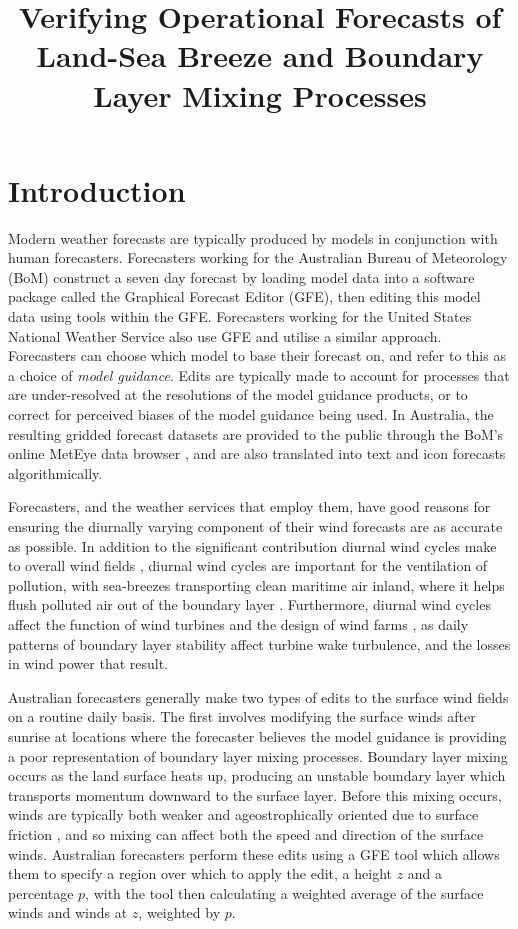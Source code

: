 \documentclass{ametsoc}
\title{Verifying Operational Forecasts of Land-Sea Breeze and Boundary Layer Mixing Processes}
\affiliation{School of Earth Sciences, and ARC Centre of Excellence for Climate Extremes, The University of Melbourne, Melbourne, Victoria, Australia.}
\begin{document}
\maketitle

\section{Introduction}
\label{Sec:Introduction}
Modern weather forecasts are typically produced by models in conjunction with human forecasters. Forecasters working for the Australian Bureau of Meteorology (BoM) construct a seven day forecast by loading model data into a software package called the Graphical Forecast Editor (GFE), then editing this model data using tools within the GFE. Forecasters working for the United States National Weather Service also use GFE and utilise a similar approach. Forecasters can choose which model to base their forecast on, and refer to this as a choice of \textit{model guidance}. Edits are typically made to account for processes that are under-resolved at the resolutions of the model guidance products, or to correct for perceived biases of the model guidance being used. In Australia, the resulting gridded forecast datasets are provided to the public through the BoM's online MetEye data browser \citep{bomMetEye19}, and are also translated into text and icon forecasts algorithmically. 

Forecasters, and the weather services that employ them, have good reasons for ensuring the diurnally varying component of their wind forecasts are as accurate as possible. In addition to the significant contribution diurnal wind cycles make to overall wind fields \citep[e.g.][]{dai99}, diurnal wind cycles are important for the ventilation of pollution, with sea-breezes transporting clean maritime air inland, where it helps flush polluted air out of the boundary layer \citep{miller03, physick92}. Furthermore, diurnal wind cycles affect the function of wind turbines \citep{englberger18} and the design of wind farms \citep{abkar16}, as daily patterns of boundary layer stability affect turbine wake turbulence, and the losses in wind power that result.

Australian forecasters generally make two types of edits to the surface wind fields on a routine daily basis. The first involves modifying the surface winds after sunrise at locations where the forecaster believes the model guidance is providing a poor representation of boundary layer mixing processes. Boundary layer mixing occurs as the land surface heats up, producing an unstable boundary layer which transports momentum downward to the surface layer. Before this mixing occurs, winds are typically both weaker and ageostrophically oriented due to surface friction \citep{lee18}, and so mixing can affect both the speed and direction of the surface winds. Australian forecasters perform these edits using a GFE tool which allows them to specify a region over which to apply the edit, a height $z$ and a percentage $p$, with the tool then calculating a weighted average of the surface winds and winds at $z$, weighted by $p$.
\end{document}
